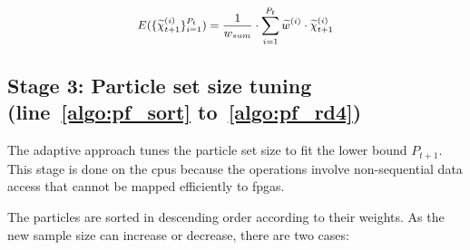 \begin{equation}
\small
\begin{aligned}
E(\{\widetilde{\chi}_{t+1}^{(i)}\}^{P_t}_{i=1}) = \frac{1}{w_{sum}} \cdot \sum_{i=1}^{P_{t}} \widetilde{w}^{(i)} \cdot \widetilde{\chi}_{t+1}^{(i)}
\end{aligned}
\label{eqt:bound8}
\end{equation}

\subsection{Stage 3: Particle set size tuning (line~\ref{algo:pf_sort} to~\ref{algo:pf_rd4})} 
The adaptive approach tunes the particle set size to fit the lower bound $P_{t+1}$.
This stage is done on the \gls{cpu}s because the operations involve non-sequential data access that cannot be mapped efficiently to \gls{fpga}s.

The particles are sorted in descending order according to their weights.
As the new sample size can increase or decrease, there are two cases:

